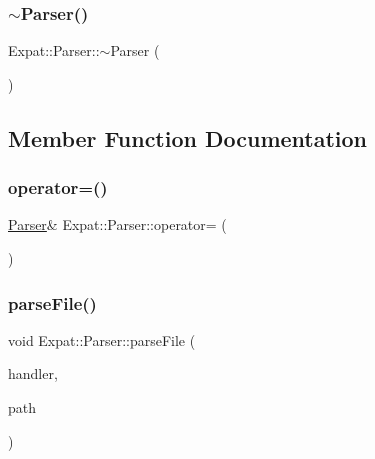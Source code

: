 \hypertarget{class_expat_1_1_parser_a010a8ab512b43fe40ed79f77363773cc}{}\label{class_expat_1_1_parser_a010a8ab512b43fe40ed79f77363773cc} 
\subsubsection{\texorpdfstring{$\sim$\+Parser()}{~Parser()}}
{\footnotesize\ttfamily Expat\+::\+Parser\+::$\sim$\+Parser (\begin{DoxyParamCaption}{ }\end{DoxyParamCaption})\hspace{0.3cm}{\ttfamily [virtual]}}



\subsection{Member Function Documentation}
\hypertarget{class_expat_1_1_parser_a5091e3622d34fc04f1f51dd5b48e69af}{}\label{class_expat_1_1_parser_a5091e3622d34fc04f1f51dd5b48e69af} 
\subsubsection{\texorpdfstring{operator=()}{operator=()}}
{\footnotesize\ttfamily \hyperlink{class_expat_1_1_parser}{Parser}\& Expat\+::\+Parser\+::operator= (\begin{DoxyParamCaption}\item[{const \hyperlink{class_expat_1_1_parser}{Parser} \&}]{ }\end{DoxyParamCaption})\hspace{0.3cm}{\ttfamily [delete]}}

\hypertarget{class_expat_1_1_parser_af3ac9195ddabde325e21aa2262e1ca4d}{}\label{class_expat_1_1_parser_af3ac9195ddabde325e21aa2262e1ca4d} 
\subsubsection{\texorpdfstring{parse\+File()}{parseFile()}\hspace{0.1cm}{\footnotesize\ttfamily [1/2]}}
{\footnotesize\ttfamily void Expat\+::\+Parser\+::parse\+File (\begin{DoxyParamCaption}\item[{\hyperlink{class_expat_1_1_parse_handler}{Parse\+Handler} \&}]{handler,  }\item[{const char $\ast$}]{path }\end{DoxyParamCaption})}

